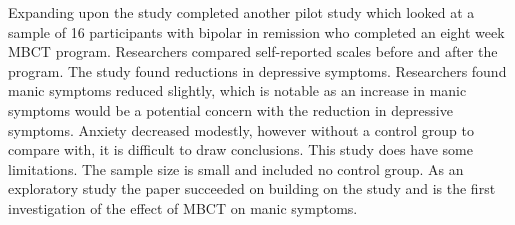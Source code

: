 Expanding upon the \cite{williams_mindfulness-based_2008} study \cite{miklowitz_pilot_2009} completed another pilot study which looked at a sample of 16 participants with bipolar in remission who completed an eight week MBCT program. Researchers compared self-reported scales before and after the program. The study found reductions in depressive symptoms. Researchers found manic symptoms reduced slightly, which is notable as an increase in manic symptoms would be a potential concern with the reduction in depressive symptoms. Anxiety decreased modestly, however without a control group to compare with, it is difficult to draw conclusions. This study does have some limitations. The sample size is small and included no control group. As an exploratory study the paper succeeded on building on the \cite{williams_mindfulness-based_2008} study and is the first investigation of the effect of MBCT on manic symptoms.